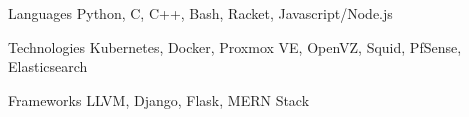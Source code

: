 
\begin{cvskills}
  \cvskill
    {Languages} %
    {Python, C, C++, Bash, Racket, Javascript/Node.js} %

  \cvskill
    {Technologies} %
    {Kubernetes, Docker, Proxmox VE, OpenVZ, Squid, PfSense, Elasticsearch} %

  \cvskill
	{Frameworks} %
	{LLVM, Django, Flask, MERN Stack} %
\end{cvskills}
